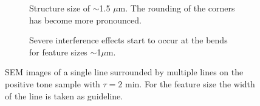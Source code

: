 \begin{figure}[!t]
    \hfill
    \begin{subfigure}[t]{0.24\linewidth}
      	\caption{Structure size of $\sim$1.5 $\mu$m. The rounding of the corners has become more pronounced.}
      	\label{fig:b2d15_q15}
    \end{subfigure}
    \hfill
    \begin{subfigure}[t]{0.24\linewidth}
      	\caption{Severe interference effects start to occur at the bends for feature sizes $\sim$1$\mu$m.}
      	\label{fig:b2d16_q16}
    \end{subfigure}
    \caption{SEM images of a single line surrounded by multiple lines on the positive tone sample with $\tau = 2$ min. For the feature size the width of the line is taken as guideline.}
\end{figure}

